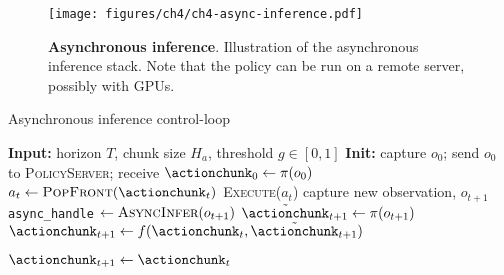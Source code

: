 \begin{figure}
    \centering
    \begin{minipage}[t]{\textwidth}
        \centering
        \texttt{[image: figures/ch4/ch4-async-inference.pdf]}
        \caption{\textbf{Asynchronous inference}. Illustration of the asynchronous inference stack. Note that the policy can be run on a remote server, possibly with GPUs.}
        \label{fig:ch4-async-inference}
    \end{minipage}
    \vspace{-0.6cm}
\end{figure}

\begin{algorithm}
  \caption{Asynchronous inference control-loop}
  \label{alg:async-inference}
  \begin{algorithmic}[1]
    \State \textbf{Input:} horizon \( T \), chunk size \( H_a \), threshold \( g\in[0,1] \)
    \State \textbf{Init:} capture \( o_0 \); send \( o_0 \) to \textsc{PolicyServer};
           receive \( \actionchunk_0 \gets \pi(o_0) \)
        \State \( a_t \gets \textsc{PopFront}(\actionchunk_t) \)
        \State \textsc{Execute}(\( a_t \)) 
         
            \State capture new observation, \( o_{t+1} \)
             
                \State \texttt{async\_handle} \( \gets \textsc{AsyncInfer}(o_{t+1})\) 
                \State \( \tilde{\actionchunk}_{t+1} \gets \pi(o_{t+1}) \) 
                \State \( \actionchunk_{t+1} \gets f(\actionchunk_t,\tilde{\actionchunk}_{t+1}) \) 
                
            \EndIf
        \EndIf
            \State \( \actionchunk_{t+1} \gets \actionchunk_t \) 
        \EndIf
    \EndFor
  \end{algorithmic}
\end{algorithm}

